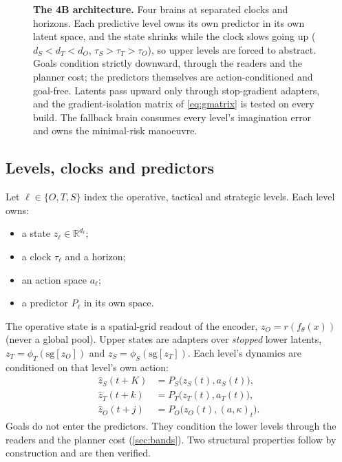 \documentclass[10pt,twocolumn]{article}
\theoremstyle{remark}
\newcommand{\Rset}{\mathbb{R}}
\begin{document}
\begin{figure}[t]
{}
\caption{\textbf{The 4B architecture.} Four brains at separated clocks and horizons. Each predictive level owns its own predictor in
its own latent space, and the state shrinks while the clock slows going up ($d_S<d_T<d_O$, $\tau_S>\tau_T>\tau_O$), so upper levels
are forced to abstract. Goals condition strictly downward, through the readers and the planner cost; the predictors themselves are action-conditioned and goal-free. Latents pass upward only through stop-gradient adapters, and the
gradient-isolation matrix of \cref{eq:gmatrix} is tested on every build. The fallback brain consumes every level's imagination error
and owns the minimal-risk manoeuvre.}
\label{fig:4b}
\end{figure}

\subsection{Levels, clocks and predictors}
Let $\ell\in\{O,T,S\}$ index the operative, tactical and strategic levels. Each level owns:
\begin{itemize}
  \item a state $z_\ell\in\Rset^{d_\ell}$;
  \item a clock $\tau_\ell$ and a horizon;
  \item an action space $a_\ell$;
  \item a predictor $P_\ell$ in its own space.
\end{itemize}
The operative state is a spatial-grid readout of the encoder, $z_O=r(f_\theta(x))$ (never a global pool). Upper states are adapters over
\emph{stopped} lower latents, $z_T=\phi_T(\mathrm{sg}[z_O])$ and $z_S=\phi_S(\mathrm{sg}[z_T])$. Each level's dynamics are conditioned on
that level's own action:
\begin{equation}
\begin{aligned}
\hat z_S(t{+}K) &= P_S\big(z_S(t),a_S(t)\big),\\
\hat z_T(t{+}k) &= P_T\big(z_T(t),a_T(t)\big),\\
\hat z_O(t{+}j) &= P_O\big(z_O(t),(a,\kappa)_t\big).
\end{aligned}
\end{equation}
Goals do not enter the predictors. They condition the lower levels through the readers and the planner cost (\cref{sec:bands}).
Two structural properties follow by construction and are then verified.
\end{document}
